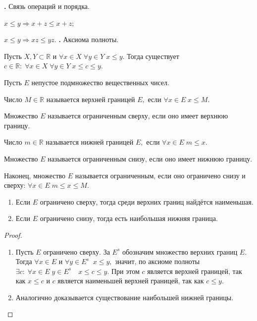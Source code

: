 {\bf {}.} Связь операций и порядка.

$x\leq y \Rightarrow x+z\leq x+z;$

$x\leq y \Rightarrow xz\leq yz.$
\newpage
{\bf {}.} Аксиома полноты.

Пусть $X, Y\subset \mathbb{R}$ и $\forall x\in X \; \forall y\in Y \; x\leq y.$ Тогда существует $c\in\mathbb{R}: \; \forall x\in X \; \forall y\in Y \; x\leq c\leq y.$
\begin{figure}[h]
\end{figure}


\begin{Definition}
Пусть $E$ непустое подмножество вещественных чисел.

Число $M\in\mathbb{R}$ называется верхней границей $E,$ если $\forall x\in E\; x\leq M.$

Множество $E$ называется ограниченным сверху, если оно имеет верхнюю границу.

Число $m\in\mathbb{R}$ называется нижней границей $E,$ если $\forall x\in E\; m\leq x.$

Множество $E$ называется ограниченным снизу, если оно имеет нижнюю границу.

Наконец, множество $E$ называется ограниченным, если оно ограничено снизу и сверху: $\forall x\in E\; m\leq x\leq M.$
\end{Definition}

\begin{Theorem}
\begin{enumerate}
\item Если $E$ ограничено сверху, тогда среди верхних границ найдётся наименьшая.
\item Если $E$ ограничено снизу, тогда есть наибольшая нижняя граница.
\end{enumerate}
\end{Theorem}
\begin{proof}
\begin{enumerate}
\item Пусть $E$ ограничено сверху. За $E^s$ обозначим множество верхних границ $E.$ Тогда $\forall x\in E$ и $\forall y\in E^s \;\; x\leq y,$ значит, по аксиоме полноты $\exists c: \; \forall x\in E\; y\in E^s \quad x\leq c\leq y.$ При этом $c$ является верхней границей, так как $x\leq c$ и $c$ является наименьшей верхней границей, так как $c\leq y.$
\item Аналогично доказывается существование наибольшей нижней границы.
\end{enumerate}
\end{proof}

